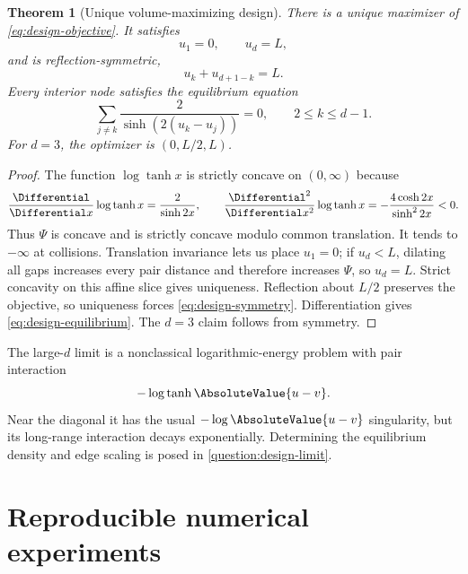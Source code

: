 \documentclass[11pt,a4paper]{article}
\newtheorem{theorem}{Theorem}[section]
\theoremstyle{definition}
\theoremstyle{remark}
\begin{document}
\begin{theorem}[Unique volume-maximizing design]
\label{thm:unique-design}
There is a unique maximizer of \eqref{eq:design-objective}.  It satisfies
\begin{equation}
  u_1=0,\qquad u_d=L,
  \label{eq:design-endpoints}
\end{equation}
and is reflection-symmetric,
\begin{equation}
  u_k+u_{d+1-k}=L.
  \label{eq:design-symmetry}
\end{equation}
Every interior node satisfies the equilibrium equation
\begin{equation}
  \sum_{j\ne k}\frac{2}{\sinh(2(u_k-u_j))}=0,
  \qquad 2\le k\le d-1.
  \label{eq:design-equilibrium}
\end{equation}
For $d=3$, the optimizer is $(0,L/2,L)$.
\end{theorem}

\begin{proof}
The function $\log\tanh x$ is strictly concave on $(0,\infty)$ because
\begin{equation}
  \frac{\Differential}{\Differential x}\log\tanh x=\frac{2}{\sinh2x},
  \qquad
  \frac{\Differential^2}{\Differential x^2}\log\tanh x
   =-\frac{4\cosh2x}{\sinh^22x}<0.
\end{equation}
Thus $\Psi$ is concave and is strictly concave modulo common translation.  It tends to $-\infty$ at collisions.  Translation invariance lets us place $u_1=0$; if $u_d<L$, dilating all gaps increases every pair distance and therefore increases $\Psi$, so $u_d=L$.  Strict concavity on this affine slice gives uniqueness.  Reflection about $L/2$ preserves the objective, so uniqueness forces \eqref{eq:design-symmetry}.  Differentiation gives \eqref{eq:design-equilibrium}.  The $d=3$ claim follows from symmetry.
\end{proof}

The large-$d$ limit is a nonclassical logarithmic-energy problem with pair
interaction
\[
  -\log\tanh\AbsoluteValue{u-v}.
\]
Near the diagonal it has the usual $-\log\AbsoluteValue{u-v}$ singularity, but
its long-range interaction decays exponentially. Determining the equilibrium
density and edge scaling is posed in \cref{question:design-limit}.

\section{Reproducible numerical experiments}
\label{sec:numerics}
\end{document}
